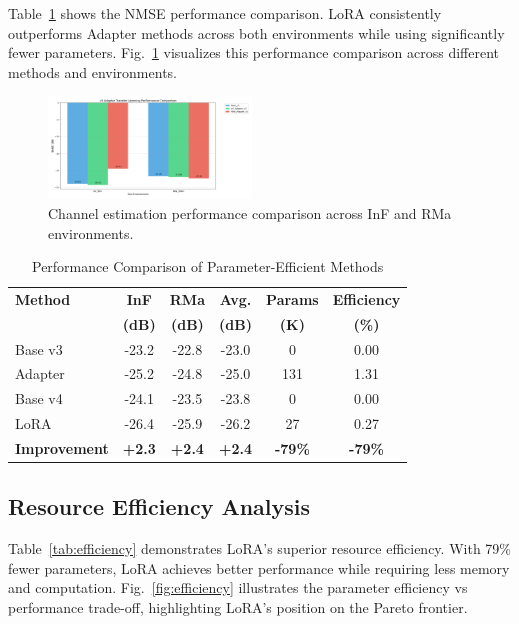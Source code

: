 \documentclass[conference]{IEEEtran}
\begin{document}
Table~\ref{tab:performance} shows the NMSE performance comparison. LoRA consistently outperforms Adapter methods across both environments while using significantly fewer parameters. Fig.~\ref{fig:performance} visualizes this performance comparison across different methods and environments.

\begin{figure}[t]
\centering
\includegraphics[width=0.48\textwidth]{figures/performance_comparison.pdf}
\caption{Channel estimation performance comparison across InF and RMa environments.}
\label{fig:performance}
\end{figure}

\begin{table}[t]
\centering
\caption{Performance Comparison of Parameter-Efficient Methods}
\label{tab:performance}
\begin{tabular}{lccccc}
\toprule
\textbf{Method} & \textbf{InF} & \textbf{RMa} & \textbf{Avg.} & \textbf{Params} & \textbf{Efficiency} \\
 & \textbf{(dB)} & \textbf{(dB)} & \textbf{(dB)} & \textbf{(K)} & \textbf{(\%)} \\
\midrule
Base v3 & -23.2 & -22.8 & -23.0 & 0 & 0.00 \\
Adapter & -25.2 & -24.8 & -25.0 & 131 & 1.31 \\
Base v4 & -24.1 & -23.5 & -23.8 & 0 & 0.00 \\
LoRA & -26.4 & -25.9 & -26.2 & 27 & 0.27 \\
\midrule
\textbf{Improvement} & \textbf{+2.3} & \textbf{+2.4} & \textbf{+2.4} & \textbf{-79\%} & \textbf{-79\%} \\
\bottomrule
\end{tabular}
\end{table}

\subsection{Resource Efficiency Analysis}

Table~\ref{tab:efficiency} demonstrates LoRA's superior resource efficiency. With 79\% fewer parameters, LoRA achieves better performance while requiring less memory and computation. Fig.~\ref{fig:efficiency} illustrates the parameter efficiency vs performance trade-off, highlighting LoRA's position on the Pareto frontier.
\end{document}
